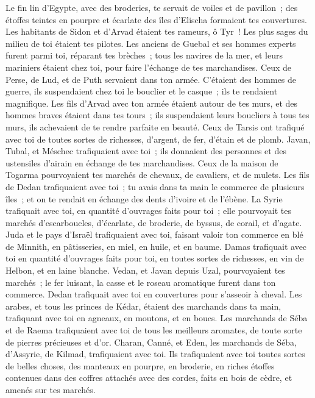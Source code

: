 \begin{multicols}{2}
Le fin lin d'Egypte, avec des broderies, te servait de voiles et de pavillon~; des étoffes teintes en pourpre et écarlate des îles d'Elischa formaient tes couvertures.
Les habitants de Sidon et d'Arvad étaient tes rameurs, ô Tyr~! Les plus sages du milieu de toi étaient tes pilotes.
Les anciens de Guebal et ses hommes experts furent parmi toi, réparant tes brèches~; tous les navires de la mer, et leurs mariniers étaient chez toi, pour faire l'échange de tes marchandises.
Ceux de Perse, de Lud, et de Puth servaient dans ton armée. C'étaient des hommes de guerre, ils suspendaient chez toi le bouclier et le casque~; ils te rendaient magnifique.
Les fils d'Arvad avec ton armée étaient autour de tes murs, et des hommes braves étaient dans tes tours~; ils suspendaient leurs boucliers à tous tes murs, ils achevaient de te rendre parfaite en beauté.
Ceux de Tarsis ont trafiqué avec toi de toutes sortes de richesses, d'argent, de fer, d'étain et de plomb.
Javan, Tubal, et Méschec trafiquaient avec toi~; ils donnaient des personnes et des ustensiles d'airain en échange de tes marchandises.
Ceux de la maison de Togarma pourvoyaient tes marchés de chevaux, de cavaliers, et de mulets.
Les fils de Dedan trafiquaient avec toi~; tu avais dans ta main le commerce de plusieurs îles~; et on te rendait en échange des dents d'ivoire et de l'ébène.
La Syrie trafiquait avec toi, en quantité d'ouvrages faits pour toi~; elle pourvoyait tes marchés d'escarboucles, d'écarlate, de broderie, de byssus, de corail, et d'agate.
Juda et le pays d'Israël trafiquaient avec toi, faisant valoir ton commerce en blé de Minnith, en pâtisseries, en miel, en huile, et en baume.
Damas trafiquait avec toi en quantité d'ouvrages faits pour toi, en toutes sortes de richesses, en vin de Helbon, et en laine blanche.
Vedan, et Javan depuis Uzal, pourvoyaient tes marchés~; le fer luisant, la casse et le roseau aromatique furent dans ton commerce.
Dedan trafiquait avec toi en couvertures pour s'asseoir à cheval.
Les arabes, et tous les princes de Kédar, étaient des marchands dans ta main, trafiquant avec toi en agneaux, en moutons, et en boucs.
Les marchands de Séba et de Raema trafiquaient avec toi de tous les meilleurs aromates, de toute sorte de pierres précieuses et d'or.
Charan, Canné, et Eden, les marchands de Séba, d'Assyrie, de Kilmad, trafiquaient avec toi.
Ils trafiquaient avec toi toutes sortes de belles choses, des manteaux en pourpre, en broderie, en riches étoffes contenues dans des coffres attachés avec des cordes, faits en bois de cèdre, et amenés sur tes marchés.

\end{multicols}
